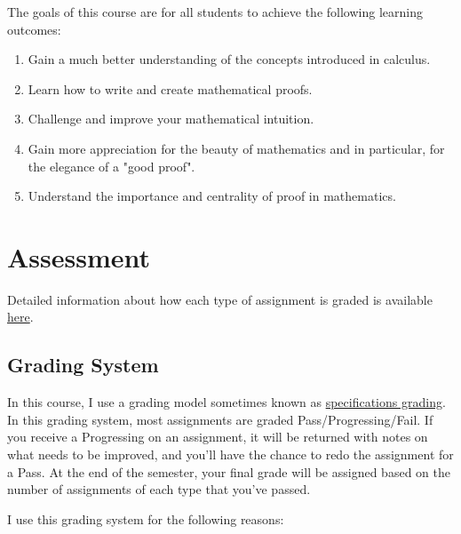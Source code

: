 \documentclass[11pt, a4paper]{article}
\begin{document}
The goals of this course are for all students to achieve the following learning outcomes:
\begin{enumerate}
\item Gain a much better understanding of the concepts introduced in calculus.
\item Learn how to write and create mathematical proofs.
\item Challenge and improve your mathematical intuition.
\item Gain more appreciation for the beauty of mathematics and in particular, for the elegance of a "good proof".
\item Understand the importance and centrality of proof in mathematics.
\end{enumerate}

\section*{Assessment}

Detailed information about how each type of assignment is graded is available \href{https://www.dropbox.com/s/7gbt1ffy9c02er0/Specifications_for_Student_Work_in_MATH_321.pdf?dl=0}{here}.

\subsection*{Grading System} In this course, I use a grading model sometimes known as \href{https://www.insidehighered.com/views/2016/01/19/new-ways-grade-more-effectively-essay}{specifications grading}. In this grading system, most assignments are graded Pass/Progressing/Fail. If you receive a Progressing on an assignment, it will be returned with notes on what needs to be improved, and you'll have the chance to redo the assignment for a Pass. At the end of the semester, your final grade will be assigned based on the number of assignments of each type that you've passed.

I use this grading system for the following reasons:
\end{document}
